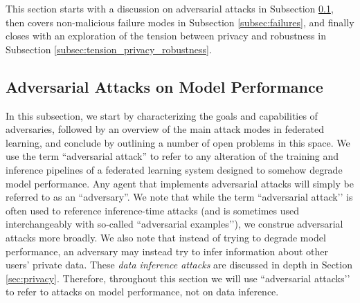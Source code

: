 \documentclass[11pt]{article}
\begin{document}
This section starts with a discussion on adversarial attacks in Subsection \ref{subsec:adversarial_attacks}, then covers non-malicious failure modes in Subsection \ref{subsec:failures}, and finally closes with an exploration of the tension between privacy and robustness in Subsection \ref{subsec:tension_privacy_robustness}.

\subsection{Adversarial Attacks on Model Performance}
\label{subsec:adversarial_attacks}

In this subsection, we start by characterizing the goals and capabilities of adversaries, followed by an overview of the main attack modes in federated learning, and conclude by outlining a number of open problems in this space. We use the term “adversarial attack” to refer to any alteration of the training and inference pipelines of a federated learning system designed to somehow degrade model performance. Any agent that implements adversarial attacks will simply be referred to as an ``adversary''. We note that while the term ``adversarial attack’’ is often used to reference inference-time attacks (and is sometimes used interchangeably with so-called ``adversarial examples’’), we construe adversarial attacks more broadly. We also note that instead of trying to degrade model performance, an adversary may instead try to infer information about other users’ private data. These \textit{data inference attacks} are discussed in depth in Section \ref{sec:privacy}. Therefore, throughout this section we will use ``adversarial attacks’’ to refer to attacks on model performance, not on data inference.
\end{document}
